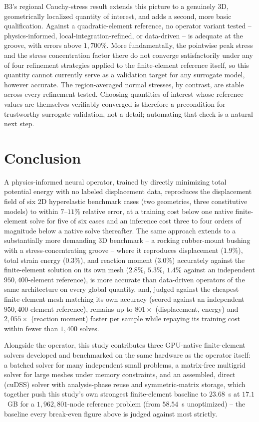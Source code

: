 \documentclass[final,5p,times]{elsarticle}
\begin{document}
B3's regional Cauchy-stress result extends
this picture to a genuinely 3D, geometrically localized quantity of
interest, and adds a second, more basic qualification. Against a
quadratic-element reference, no operator variant tested -- physics-informed,
local-integration-refined, or data-driven -- is adequate at the groove,
with errors above $1{,}700\%$. More fundamentally, the pointwise peak
stress and the stress concentration factor there do not converge
satisfactorily under any of four refinement strategies applied to the
finite-element reference itself, so this quantity cannot currently serve
as a validation target for any surrogate model, however accurate. The
region-averaged normal stresses, by contrast, are stable across every
refinement tested. Choosing quantities of interest whose reference values are
themselves verifiably converged is therefore a precondition for
trustworthy surrogate validation, not a detail; automating that check is
a natural next step.

\FloatBarrier
\section{Conclusion}
\label{sec:conclusion}

A physics-informed neural operator, trained by directly minimizing total
potential energy with no labeled displacement data, reproduces the
displacement field of six 2D hyperelastic benchmark cases (two geometries,
three constitutive models) to within $7$--$11\%$ relative error, at a
training cost below one native finite-element solve for five of six cases
and an inference cost three to four orders of magnitude below a native
solve thereafter. The same approach extends to a substantially more
demanding 3D benchmark -- a rocking rubber-mount bushing with a
stress-concentrating groove -- where it reproduces displacement ($1.9\%$),
total strain energy ($0.3\%$), and reaction moment ($3.0\%$) accurately
against the finite-element solution on its own mesh ($2.8\%$, $5.3\%$,
$1.4\%$ against an independent $950{,}400$-element reference), is more
accurate than data-driven operators of the same architecture on every
global quantity, and, judged against the cheapest finite-element mesh matching its own
accuracy (scored against an independent $950{,}400$-element reference),
remains up to $801\times$ (displacement, energy) and $2{,}055\times$
(reaction moment) faster per sample while repaying
its training cost within fewer than $1{,}400$ solves.

Alongside the operator, this study contributes three GPU-native
finite-element solvers developed and benchmarked on the same hardware as
the operator itself: a batched solver for many independent small
problems, a matrix-free multigrid solver for large meshes under memory
constraints, and an assembled, direct (cuDSS) solver with analysis-phase
reuse and symmetric-matrix storage, which together push this study's own
strongest finite-element baseline to $23.68$~s at $17.1$~GB for a
$1{,}962{,}801$-node reference problem (from $58.54$~s unoptimized) --
the baseline every break-even figure above is judged against most
strictly.
\end{document}
